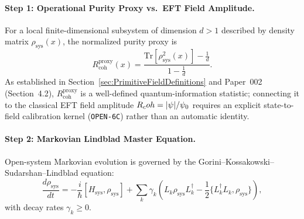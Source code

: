 \paragraph{Step 1: Operational Purity Proxy vs.\ EFT Field Amplitude.}
For a local finite-dimensional subsystem of dimension $d > 1$ described by density matrix $\rho_{\mathrm{sys}}(x)$, the normalized purity proxy is
\begin{equation}
    R_{\mathrm{coh}}^{\mathrm{proxy}}(x) = \frac{\mathrm{Tr}[\rho_{\mathrm{sys}}^2(x)] - \frac{1}{d}}{1 - \frac{1}{d}}.
\label{eq:Rcoh_purity_relation}
\end{equation}
As established in Section~\ref{sec:PrimitiveFieldDefinitions} and Paper~002 (Section~4.2), $R_{\mathrm{coh}}^{\mathrm{proxy}}$ is a well-defined quantum-information statistic; connecting it to the classical EFT field amplitude $R_coh = |\psi|/\psi_0$ requires an explicit state-to-field calibration kernel (\texttt{OPEN-6C}) rather than an automatic identity.

\paragraph{Step 2: Markovian Lindblad Master Equation.}
Open-system Markovian evolution is governed by the Gorini--Kossakowski--Sudarshan--Lindblad equation:
\begin{equation}
    \frac{d\rho_{\mathrm{sys}}}{dt} = -\frac{i}{\hbar}[H_{\mathrm{sys}}, \rho_{\mathrm{sys}}] + \sum_k \gamma_k \left( L_k \rho_{\mathrm{sys}} L_k^\dagger - \frac{1}{2}\{L_k^\dagger L_k, \rho_{\mathrm{sys}}\} \right),
    \label{eq:Lindblad_equation}
\end{equation}
with decay rates $\gamma_k \ge 0$.

